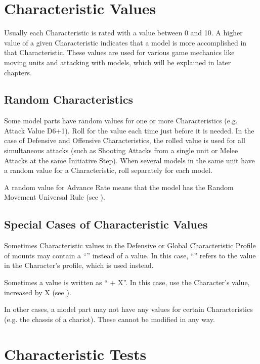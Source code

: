 \newpage
\section{Characteristic Values}
\label{characteristic_values}

Usually each Characteristic is rated with a value between 0 and 10. A higher value of a given Characteristic indicates that a model is more accomplished in that Characteristic. These values are used for various game mechanics like moving units and attacking with models, which will be explained in later chapters.

\subsection{Random Characteristics}

Some model parts have random values for one or more Characteristics (e.g. Attack Value D6+1). Roll for the value each time just before it is needed. In the case of Defensive and Offensive Characteristics, the rolled value is used for all simultaneous attacks (such as Shooting Attacks from a single unit or Melee Attacks at the same Initiative Step). When several models in the same unit have a random value for a Characteristic, roll separately for each model.

A random value for Advance Rate means that the model has the Random Movement Universal Rule (see ).

\subsection{Special Cases of Characteristic Values}
\label{special_cases_of_characteristic_values}

Sometimes Characteristic values in the Defensive or Global Characteristic Profile of mounts may contain a \enquote{\ascharacter{}} instead of a value. In this case, \enquote{\ascharacter{}} refers to the value in the Character’s profile, which is used instead.

Sometimes a value is written as \enquote{\ascharacter{} + X}. In this case, use the Character’s value, increased by X (see ).

In other cases, a model part may not have any values for certain Characteristics (e.g. the chassis of a chariot). These cannot be modified in any way.

\section{Characteristic Tests}
\label{characteristic_tests}

